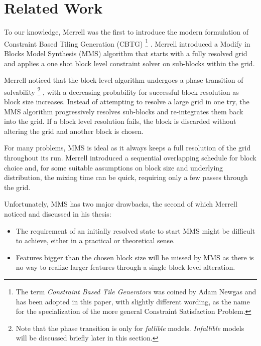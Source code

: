 \section{Related Work}

To our knowledge, Merrell was the first to introduce the modern formulation of Constraint Based Tiling Generation (CBTG)
\footnote{The term \textit{Constraint Based Tile Generators} was coined by Adam Newgas \cite{BorisTheBrave_cbtg_2021} and has been adopted in this paper,
with slightly different wording, as the name for the specialization of the more general Constraint Satisfaction Problem.}
\cite{Merrell_2007, Merrell_2009}.
Merrell introduced a Modify in Blocks Model Synthesis (MMS) algorithm that starts with a fully resolved grid
and applies a one shot block level constraint solver on sub-blocks within the grid.

Merrell noticed that the block level algorithm undergoes a phase transition of solvability
\footnote{ Note that the phase transition is only for \textit{fallible} models. \textit{Infallible} models will be discussed briefly later in this section. }
, with a decreasing probability
for successful block resolution as block size increases.
Instead of attempting to resolve a large grid in one try, the MMS algorithm progressively resolves sub-blocks and re-integrates them back into the grid.
If a block level resolution fails, the block is discarded without altering the grid and another block is chosen.

For many problems, MMS is ideal as it always keeps a full resolution of the grid throughout its run.
Merrell introduced a sequential overlapping schedule for block choice and, for some suitable assumptions
on block size and underlying distribution, the mixing time can be quick, requiring only a few passes through the grid.

Unfortunately, MMS has two major drawbacks, the second of which Merrell noticed and discussed in his thesis:

\begin{itemize}
  \item The requirement of an initially resolved state to start MMS might be difficult to achieve, either in a practical
        or theoretical sense.
  \item Features bigger than the chosen block size will be missed by MMS as there is no way to realize larger features
        through a single block level alteration.
\end{itemize}

